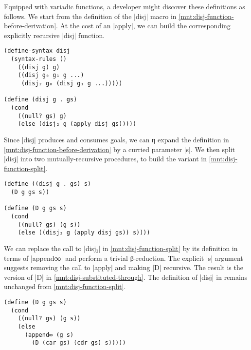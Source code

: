 \documentclass[sigplan,screen,draft,anonymous,review,natbib=false]{acmart}
\begin{document}
Equipped with variadic functions, a developer might discover these
definitions as follows. We start from the definition of the
\rackinline|disj| macro in \cref{mnt:disj-function-before-derivation}.
At the cost of an \rackinline|apply|, we can build the corresponding
explicitly recursive \rackinline|disj| function.

\begin{listing}[h]
\begin{verbatim}
(define-syntax disj
  (syntax-rules ()
    ((disj g) g)
    ((disj g₀ g₁ g ...)
     (disj₂ g₀ (disj g₁ g ...)))))

(define (disj g . gs)
  (cond
    ((null? gs) g)
    (else (disj₂ g (apply disj gs)))))
\end{verbatim}
  \caption{Deriving \rackinline|disj| function from macro.}
  \label{mnt:disj-function-before-derivation}
\end{listing}

\noindent Since \rackinline|disj| produces and consumes goals, we can
η expand the definition in \cref{mnt:disj-function-before-derivation}
by a curried parameter \rackinline|s|. We then split \rackinline|disj|
into two mutually-recursive procedures, to build the variant in
\cref{mnt:disj-function-split}.

\begin{listing}[h]
\begin{verbatim}
(define ((disj g . gs) s)
  (D g gs s))

(define (D g gs s)
  (cond
    ((null? gs) (g s))
    (else ((disj₂ g (apply disj gs)) s))))
\end{verbatim}
  \caption{An η expanded and split definition of \rackinline|disj|.}
  \label{mnt:disj-function-split}
\end{listing}

\noindent We can replace the call to \rackinline|disj₂| in
\cref{mnt:disj-function-split} by its definition in terms of
\rackinline|append∞| and perform a trivial β-reduction. The explicit
\rackinline|s| argument suggests removing the call to
\rackinline|apply| and making \rackinline|D| recursive. The result is
the version of \rackinline|D| in \cref{mnt:disj-substituted-through}.
The definition of \rackinline|disj| in remains unchanged from
\cref{mnt:disj-function-split}.

\begin{listing}[h]
\begin{verbatim}
(define (D g gs s)
  (cond
    ((null? gs) (g s))
    (else
      (append∞ (g s)
        (D (car gs) (cdr gs) s)))))
\end{verbatim}
  \caption{Derivation of \rackinline|disj| function definition.}
  \label{mnt:disj-substituted-through}
\end{listing}
\end{document}
